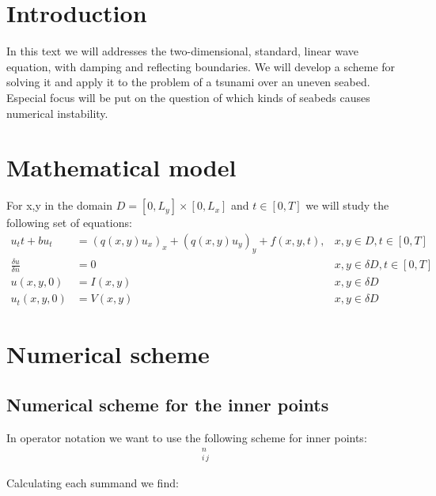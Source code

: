 \documentclass[twoside]{article}
\begin{document}
\section{Introduction}
\label{Introduction}
In this text we will addresses the two-dimensional, standard, linear wave equation, with damping and reflecting boundaries. We will develop a scheme for solving it and apply it to the problem of a tsunami over an uneven seabed. Especial focus will be put on the question of which kinds of seabeds causes numerical instability. 
\section{Mathematical model}
\label{Model}
For x,y in the domain $D = [0,L_y] \times [0,L_x]$ and $t \in [0,T]$ we will study the following set  of equations:
\begin{align}
u_tt + b u_t &= (q(x,y)u_x)_x + (q(x,y)u_y)_y +f(x,y,t), &x,y \in D, t \in [0, T] \\
\frac{\delta u}{\delta n} &= 0 &x,y \in \delta D,  t \in [0, T] \\
u(x,y,0) &= I(x,y) &x,y \in \delta D \\
u_t(x,y,0) &= V(x,y) &x,y \in \delta D
\end{align}

\section{Numerical scheme}
\label{Scheme}
\subsection{Numerical scheme for the inner points}
In operator notation we want to use the following scheme for inner points:
\begin{align}
[D_t D_t u + b D_2t u = D_x(q D_x u) + D_y (q D_y u) +f]_{i\, j}^n \label{PDE}
\end{align}

Calculating each summand we find:
\end{document}
